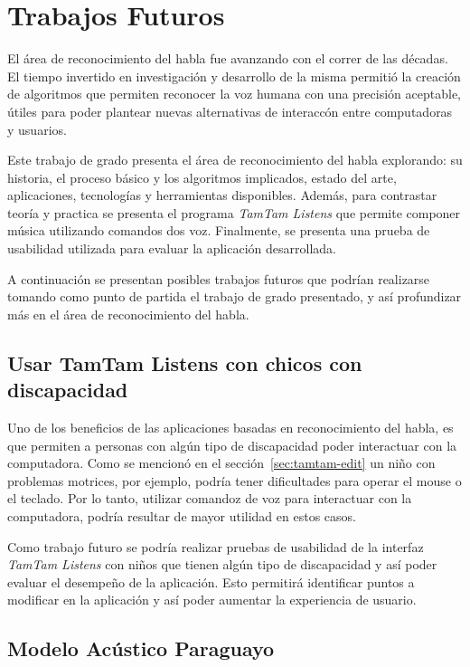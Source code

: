 \chapter{Trabajos Futuros}
\label{sec:trabajos-futuros}

El \'area de reconocimiento del habla fue avanzando con el correr de las d\'ecadas. El tiempo invertido
en investigaci\'on y desarrollo de la misma permiti\'o la creaci\'on de algoritmos que permiten
reconocer la voz humana con una precisi\'on aceptable, \'utiles para poder plantear nuevas alternativas
de interacc\'on entre computadoras y usuarios. 

Este trabajo de grado presenta el \'area de reconocimiento del habla explorando: su historia, el proceso
b\'asico y los algoritmos implicados, estado del arte, aplicaciones, tecnolog\'ias y herramientas disponibles.
Adem\'as, para contrastar teor\'ia y practica se presenta el programa \emph{TamTam Listens} que permite componer
m\'usica utilizando comandos dos voz. Finalmente, se presenta una prueba de usabilidad utilizada para evaluar la
aplicaci\'on desarrollada.

A continuaci\'on se presentan posibles trabajos futuros que podr\'ian realizarse tomando como punto de partida
el trabajo de grado presentado, y as\'i profundizar m\'as en el \'area de reconocimiento del habla.

\section{Usar TamTam Listens con chicos con discapacidad}

Uno de los beneficios de las aplicaciones basadas en reconocimiento del habla, es que permiten a personas con alg\'un
tipo de discapacidad poder interactuar con la computadora. Como se mencion\'o en el secci\'on~\ref{sec:tamtam-edit}
un ni\~no con problemas motrices, por ejemplo, podr\'ia tener dificultades para operar el mouse o el teclado. Por lo tanto,
utilizar comandoz de voz para interactuar con la computadora, podr\'ia resultar de mayor utilidad en estos casos.

Como trabajo futuro se podr\'ia realizar pruebas de usabilidad de la interfaz \emph{TamTam Listens} con ni\~nos
que tienen alg\'un tipo de discapacidad y as\'i poder evaluar el desempe\~no de la aplicaci\'on. Esto permitir\'a
identificar puntos a modificar en la aplicaci\'on y as\'i poder aumentar la experiencia de usuario.
\section{Modelo Ac\'ustico Paraguayo} 

